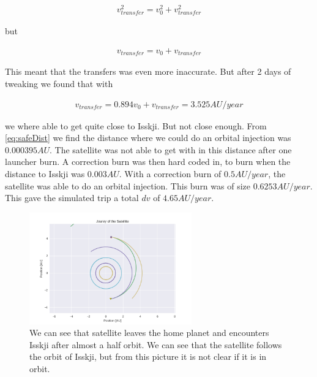 \documentclass[a4paper, 10pt]{article}
\begin{document}
\begin{align}
v_{transfer}^2 = v_0^2 + v_{transfer}^2
\end{align}  

but

\begin{align}
v_{transfer} = v_0 + v_{transfer}
\end{align} 

This meant that the transfers was even more inaccurate. But after 2 days of tweaking we found that with 

\begin{align}
v_{transfer} = 0.894v_0 + v_{transfer} = 3.525 AU/year
\end{align} 

we where able to get quite close to Isskji. But not close enough. From \ref{eq:safeDist} we find the distance where we could do an orbital injection was $0.000395 AU$. The satellite was not able to get with in this distance after one launcher burn. A correction burn was then hard coded in, to burn when the distance to Isskji was $0.003 AU$. With a correction burn of $0.5 AU/year$, the satellite was able to do an orbital injection. This burn was of size $0.6253 AU/year$. This gave the simulated trip a total $dv$ of $4.65 AU/year$.\\

\begin{figure}[H]
\centering
\includegraphics[width = 70mm]{part3SatOrb.png}
\caption{We can see that satellite leaves the home planet and encounters Isskji after almost a half orbit. We can see that the satellite follows the orbit of Isskji, but from this picture it is not clear if it is in orbit.}
\end{figure}
\end{document}
